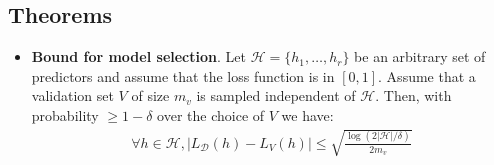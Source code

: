 \documentclass[../template.tex]{subfiles}
\begin{document}
\subsection{Theorems}
\begin{itemize}
    \item \textbf{Bound for model selection}.
    Let $\mathcal{H}= \{h_1, \dots, h_r\}$ be an arbitrary set of predictors and assume that the loss function is in $[0,1]$. Assume that a validation set $V$ of size $m_v$ is sampled independent of $\mathcal{H}$. Then, with probability $\geq 1- \delta$ over the choice of $V$ we have:
    \begin{align*}
        \forall h \in \mathcal{H}, |L_{\mathcal{D}}(h) - L_V(h)| \leq \sqrt{\frac{\log (2 |\mathcal{H}|/\delta)}{2 m_v} }
    \end{align*}  
\end{itemize}
\end{document}
